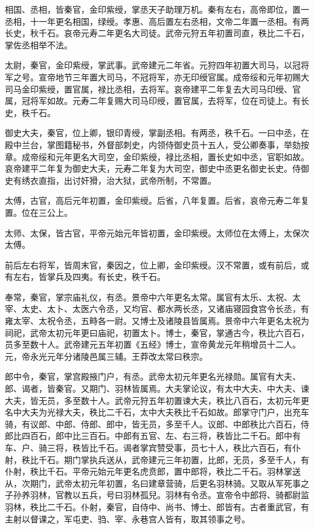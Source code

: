 \documentclass[12pt,UTF8]{ctexbook}
\begin{document}
相国、丞相，皆秦官，金印紫绶，掌丞天子助理万机。秦有左右，高帝即位，置一丞相，十一年更名相国，绿绶。孝惠、高后置左右丞相，文帝二年置一丞相。有两长史，秋千石。哀帝元寿二年更名大司徒。武帝元狩五年初置司直，秩比二千石，掌佐丞相举不法。



太尉，秦官，金印紫绶，掌武事。武帝建元二年省。元狩四年初置大司马，以冠将军之号。宣帝地节三年置大司马，不冠将军，亦无印绶官属。成帝绥和元年初赐大司马金印紫绶，置官属，禄比丞相，去将军。哀帝建平二年复去大司马印绶、官属，冠将军如故。元寿二年复赐大司马印绶，置官属，去将军，位在司徒上。有长史，秩千石。



御史大夫，秦官，位上卿，银印青绶，掌副丞相。有两丞，秩千石。一曰中丞，在殿中兰台，掌图籍秘书，外督部刺史，内领侍御史员十五人，受公卿奏事，举劾按章。成帝绥和元年更名大司空，金印紫绶，禄比丞相，置长史如中丞，官职如故。哀帝建平二年复为御史大夫，元寿二年复为大司空，御史中丞更名御史长史。侍御史有绣衣直指，出讨奸猾，治大狱，武帝所制，不常置。



太傅，古官，高后元年初置，金印紫绶。后省，八年复置。后省，哀帝元寿二年复置。位在三公上。



太师、太保，皆古官，平帝元始元年皆初置，金印紫绶。太师位在太傅上，太保次太傅。



前后左右将军，皆周末官，秦因之，位上卿，金印紫绶。汉不常置，或有前后，或有左右，皆掌兵及四夷。有长史，秩千石。



奉常，秦官，掌宗庙礼仪，有丞。景帝中六年更名太常。属官有太乐、太祝、太宰、太史、太卜、太医六令丞，又均官、都水两长丞，又诸庙寝园食宫令长丞，有雍太宰、太祝令丞，五畤各一尉。又博士及诸陵县皆属焉。景帝中六年更名太祝为祠祀，武帝太初元年更曰庙祀，初置太卜。博士，秦官，掌通古今，秩比六百石，员多至数十人。武帝建元五年初置《五经》博士，宣帝黄龙元年稍增员十二人。元，帝永光元年分诸陵邑属三辅。王莽改太常曰秩宗。



郎中令，秦官，掌宫殿掖门户，有丞。武帝太初元年更名光禄勋。属官有大夫、郎、谒者，皆秦官。又期门、羽林皆属焉。大夫掌论议，有太中大夫、中大夫、谏大夫，皆无员，多至数十人。武帝元狩五年初置谏大夫，秩比八百石，太初元年更名中大夫为光禄大夫，秩比二千石，太中大夫秩比千石如故。郎掌守门户，出充车骑，有议郎、中郎、侍郎、郎中，皆无员，多至千人。议郎、中郎秩比六百石，侍郎比四百石，郎中比三百石。中郎有五官、左、右三将，秩皆比二千石。郎中有车、户、骑三将，秩皆比千石。谒者掌宾赞受事，员七十人，秩比六百石，有仆射，秩比千石。期门掌执兵送从，武帝建元三年初置，比郎，无员，多至千人，有仆射，秩比千石。平帝元始元年更名虎贲郎，置中郎将，秩比二千石。羽林掌送从，次期门，武帝太初元年初置，名曰建章营骑，后更名羽林骑。又取从军死事之子孙养羽林，官教以五兵，号曰羽林孤兒。羽林有令丞。宣帝令中郎将、骑都尉监羽林，秩比二千石。仆射，秦官，自侍中、尚书、博士、郎皆有。古者重武官，有主射以督课之，军屯吏、驺、宰、永巷宫人皆有，取其领事之号。
\end{document}
